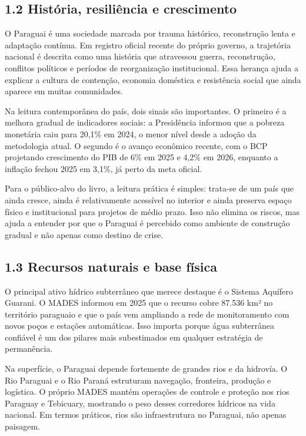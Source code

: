 \subsection{1.2 História, resiliência e
crescimento}\label{histuxf3ria-resiliuxeancia-e-crescimento}

O Paraguai é uma sociedade marcada por trauma histórico, reconstrução
lenta e adaptação contínua. Em registro oficial recente do próprio
governo, a trajetória nacional é descrita como uma história que
atravessou guerra, reconstrução, conflitos políticos e períodos de
reorganização institucional. Essa herança ajuda a explicar a cultura de
contenção, economia doméstica e resistência social que ainda aparece em
muitas comunidades.

Na leitura contemporânea do país, dois sinais são importantes. O
primeiro é a melhora gradual de indicadores sociais: a Presidência
informou que a pobreza monetária caiu para 20,1\% em 2024, o menor nível
desde a adoção da metodologia atual. O segundo é o avanço econômico
recente, com o BCP projetando crescimento do PIB de 6\% em 2025 e 4,2\%
em 2026, enquanto a inflação fechou 2025 em 3,1\%, já perto da meta
oficial.

Para o público-alvo do livro, a leitura prática é simples: trata-se de
um país que ainda cresce, ainda é relativamente acessível no interior e
ainda preserva espaço físico e institucional para projetos de médio
prazo. Isso não elimina os riscos, mas ajuda a entender por que o
Paraguai é percebido como ambiente de construção gradual e não apenas
como destino de crise.

\subsection{1.3 Recursos naturais e base
física}\label{recursos-naturais-e-base-fuxedsica}

O principal ativo hídrico subterrâneo que merece destaque é o Sistema
Aquífero Guarani. O MADES informou em 2025 que o recurso cobre 87.536
km² no território paraguaio e que o país vem ampliando a rede de
monitoramento com novos poços e estações automáticas. Isso importa
porque água subterrânea confiável é um dos pilares mais subestimados em
qualquer estratégia de permanência.

Na superfície, o Paraguai depende fortemente de grandes rios e da
hidrovía. O Rio Paraguai e o Rio Paraná estruturam navegação, fronteira,
produção e logística. O próprio MADES mantém operações de controle e
proteção nos rios Paraguay e Tebicuary, mostrando o peso desses
corredores hídricos na vida nacional. Em termos práticos, rios são
infraestrutura no Paraguai, não apenas paisagem.

